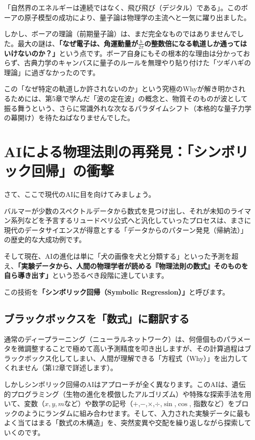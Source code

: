 「自然界のエネルギーは連続ではなく、飛び飛び（デジタル）である」。このボーアの原子模型の成功により、量子論は物理学の主流へと一気に躍り出ました。

しかし、ボーアの理論（前期量子論）は、まだ完全なものではありませんでした。最大の謎は、\textbf{「なぜ電子は、角運動量が\(\frac{h}{2\pi}\)の整数倍になる軌道しか通ってはいけないのか？」}という点です。ボーア自身にもその根本的な理由は分かっておらず、古典力学のキャンバスに量子のルールを無理やり貼り付けた「ツギハギの理論」に過ぎなかったのです。

この「なぜ特定の軌道しか許されないのか」という究極のWhyが解き明かされるためには、第5章で学んだ「波の定在波」の概念と、物質そのものが波として振る舞うという、さらに常識外れな次なるパラダイムシフト（本格的な量子力学の幕開け）を待たねばなりませんでした。

\section{AIによる物理法則の再発見：「シンボリック回帰」の衝撃}

さて、ここで現代のAIに目を向けてみましょう。

バルマーが少数のスペクトルデータから数式を見つけ出し、それが未知のライマン系列などを予言するリュードベリ公式へと汎化していったプロセスは、まさに現代のデータサイエンスが得意とする「データからのパターン発見（帰納法）」の歴史的な大成功例です。

そして現在、AIの進化は単に「犬の画像を犬と分類する」といった予測を超え、\textbf{「実験データから、人間の物理学者が読める『物理法則の数式』そのものを自ら導き出す」}という恐るべき段階に達しています。

この技術を\textbf{「シンボリック回帰（Symbolic Regression）」}と呼びます。

\subsection{ブラックボックスを「数式」に翻訳する}

通常のディープラーニング（ニューラルネットワーク）は、何億個ものパラメータを微調整することで極めて高い予測精度を叩き出しますが、その計算過程はブラックボックス化してしまい、人間が理解できる「方程式（Why）」を出力してくれません（第12章で詳述します）。

しかしシンボリック回帰のAIはアプローチが全く異なります。このAIは、遺伝的プログラミング（生物の進化を模倣したアルゴリズム）や特殊な探索手法を用いて、変数（\(x, y, m\)など）や数学の記号（\(+\),\(-\),\(\times\),\(\div\),\(\sin\),\(\cos\), 指数など）をブロックのようにランダムに組み合わせます。そして、入力された実験データに最もよく当てはまる「数式の木構造」を、突然変異や交配を繰り返しながら探索していくのです。

